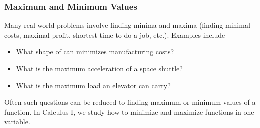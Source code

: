 \begin{frame}
\frametitle{Maximum and Minimum Values}
Many real-world problems involve finding minima and maxima (finding minimal costs, maximal profit, shortest time to do a job, etc.).  Examples include
\begin{itemize}
\item  What shape of can minimizes manufacturing costs?
\item  What is the maximum acceleration of a space shuttle?
\item  What is the maximum load an elevator can carry?
\end{itemize}
Often such questions can be reduced to finding maximum or minimum values of a function. In Calculus I, we study how to minimize and maximize functions in one variable.
\end{frame}
